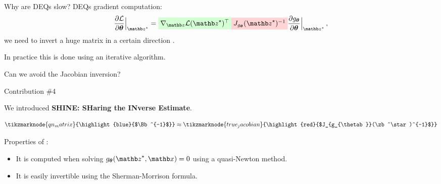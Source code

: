 \begin{frame}{Why are DEQs slow?}
    DEQs gradient computation:
    \begin{equation*}
        \frac{\partial \mathcal{L}}{\partial \thetab}\Bigr|_{\zb^\star} = \highlight{green}{$\nabla_\zb \mathcal{L}(\zb^\star)^\top$} \highlight{red}{$J_{g_{\thetab}}(\zb^\star)^{-1}$} \frac{\partial g_{\thetab}}{\partial \thetab}\Bigr|_{\zb^\star} \, ,
    \end{equation*}
    we need to invert a huge matrix  in a certain direction .
    \pause

    In practice this is done using an iterative algorithm.
\end{frame}

\begin{frame}{Can we avoid the Jacobian inversion?}
    \begin{exampleblock}{Contribution \#4}
    \end{exampleblock}
    
    We introduced \textbf{SHINE: SHaring the INverse Estimate}.

    \begin{equation*}
        \tikzmarknode{qn_matrix}{\highlight{blue}{$\Bb^{-1}$}} \approx \tikzmarknode{true_jacobian}{\highlight{red}{$J_{g_{\thetab}}(\zb^\star)^{-1}$}}
    \end{equation*}

    \pause

    \hfill \break
    Properties of :
    \begin{itemize}
        \item<4-> It is computed when solving $g_\thetab(\zb^\star, \xb) = 0$ using a quasi-Newton method.
        \item<5-> It is easily invertible using the Sherman-Morrison formula.
    \end{itemize}
\end{frame}

